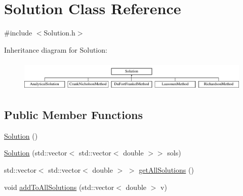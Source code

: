 \hypertarget{class_solution}{}\section{Solution Class Reference}
\label{class_solution}


{\ttfamily \#include $<$Solution.\+h$>$}

Inheritance diagram for Solution\+:\begin{figure}[H]
\begin{center}
\leavevmode
\includegraphics[height=1.473684cm]{class_solution}
\end{center}
\end{figure}
\subsection*{Public Member Functions}
\begin{DoxyCompactItemize}
\item 
\hyperlink{class_solution_ab55bd4b023d596ce11aaf737b9a6123b}{Solution} ()
\item 
\hyperlink{class_solution_acd2b9ac1b6ddd327ece034d99fc9cfdd}{Solution} (std\+::vector$<$ std\+::vector$<$ double $>$$>$ sols)
\item 
std\+::vector$<$ std\+::vector$<$ double $>$ $>$ \hyperlink{class_solution_abd28abd062adb793866fd5e1c8ef8639}{get\+All\+Solutions} ()
\item 
void \hyperlink{class_solution_a0ea58d9480ccb4e344c377f4861e1e7f}{add\+To\+All\+Solutions} (std\+::vector$<$ double $>$ v)
\end{DoxyCompactItemize}
